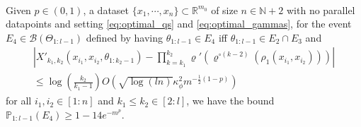 \documentclass[twoside,11pt]{article}
\newcommand{\R}{\mathbb{R}}
\newcommand{\N}{\mathbb{N}}
\newcommand{\Prob}{\mathbb{P}}
\begin{document}
\begin{proposition}\label{prop:limiting_backprop_inner_product_concentration}~\\
Given $p \in (0,1)$, a dataset $\{x_1,\cdots,x_n\} \subset \R^{m_0}$ of size $n \in \N+2$ with no parallel datapoints and setting \eqref{eq:optimal_qs} and \eqref{eq:optimal_gammas}, for the event $E_4 \in \mathcal{B}(\Theta_{1:l-1})$ defined by having $\theta_{1:l-1} \in E_4$ iff $\theta_{1:l-1} \in E_2 \cap E_3$ and
\begin{multline*}
\left\vert X'_{k_1,k_2}(x_{i_1},x_{i_2},\theta_{1:k_2-1}) - \prod_{k=k_1}^{k_2} \varrho'(\varrho^{\circ (k-2)}(\rho_1(x_{i_1},x_{i_2}))) \right\vert \\
\leq \log\left( \frac{k_2}{k_1-1} \right) O\left( \sqrt{\log(ln)} \kappa_\phi^2 m^{-\frac{1}{2}(1-p)} \right)
\end{multline*}
for all $i_1, i_2 \in [1:n]$ and $k_1 \leq k_2 \in [2:l]$, we have the bound $\Prob_{1:l-1}(E_4) \geq 1-14e^{-m^p}$.
\end{proposition}
\end{document}
